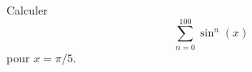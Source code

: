 \begin{exercice}\label{exoSC_serie2-0002}

	Calculer
	\begin{equation}
		\sum_{n=0}^{100}\sin^n(x)
	\end{equation}
	pour $x=\pi/5$.

\end{exercice}
